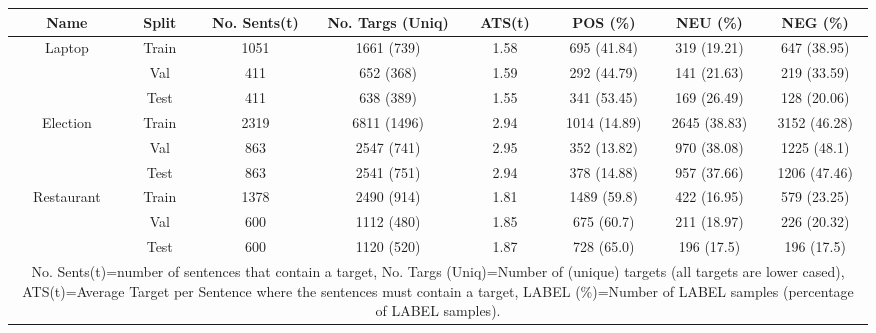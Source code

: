 
\begin{tabular}{|c|c|c|c|c|c|c|c|}
 \hline
Name & Split &  No. Sents(t) &  No. Targs (Uniq) &  ATS(t) & POS (\%) & NEU (\%) & NEG (\%) \\
 \hline
\multirow{3}{*}{Laptop} & Train &              1051 &         1661 (739) &    1.58 &   695 (41.84) &   319 (19.21) &   647 (38.95) \\
 &        Val &               411 &          652 (368) &    1.59 &   292 (44.79) &   141 (21.63) &   219 (33.59) \\
 &       Test &               411 &          638 (389) &    1.55 &   341 (53.45) &   169 (26.49) &   128 (20.06) \\
 \hline
\multirow{3}{*}{Election} &    Train &              2319 &         6811 (1496) &    2.94 &  1014 (14.89) &  2645 (38.83) &  3152 (46.28) \\
 &      Val &               863 &         2547 (741) &    2.95 &   352 (13.82) &   970 (38.08) &   1225 (48.1) \\
 &     Test &               863 &         2541 (751) &    2.94 &   378 (14.88) &   957 (37.66) &  1206 (47.46) \\
 \hline
\multirow{3}{*}{Restaurant} &  Train &              1378 &         2490 (914) &    1.81 &   1489 (59.8) &   422 (16.95) &   579 (23.25) \\
 &    Val &               600 &         1112 (480) &    1.85 &    675 (60.7) &   211 (18.97) &   226 (20.32) \\
 &   Test &               600 &         1120 (520) &    1.87 &    728 (65.0) &    196 (17.5) &    196 (17.5) \\
 \hline
 \multicolumn{8}{|p{0.86\linewidth}|}{No. Sents(t)=number of sentences that contain a target, No. Targs (Uniq)=Number of (unique) targets (all targets are lower cased), ATS(t)=Average Target per Sentence where the sentences must contain a target, LABEL (\%)=Number of LABEL samples (percentage of LABEL samples).} \\
 \hline
\end{tabular}